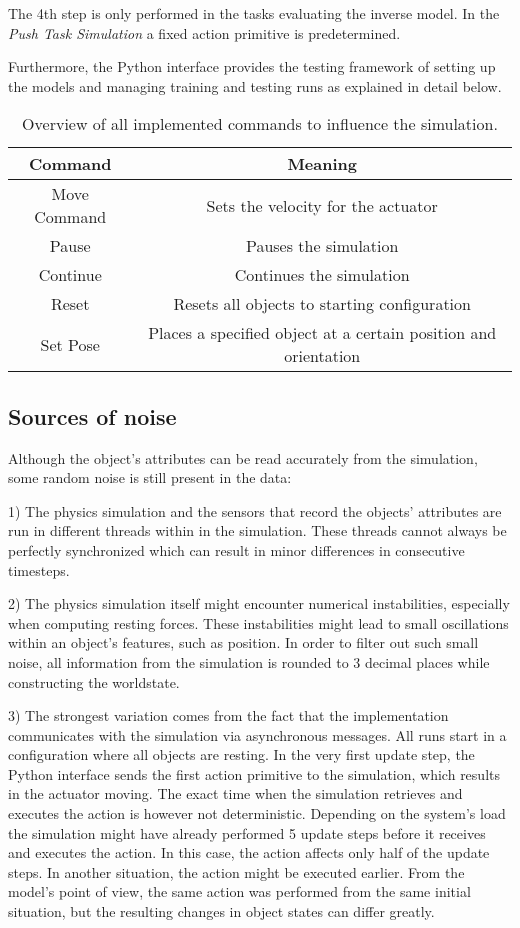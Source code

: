 The 4th step is only performed in the tasks evaluating the inverse model. In the \textit{Push Task Simulation} a fixed action primitive is predetermined.

Furthermore, the Python interface provides the testing framework of setting up the models and managing training and testing runs as explained in detail below.

\begin{table}
	\centering
	\begin{tabular}{|c|c|}
		\hline \textbf{Command} & \textbf{Meaning} \\ 
		\hline Move Command & Sets the velocity for the actuator \\ 
		\hline Pause & Pauses the simulation \\
		\hline Continue & Continues the simulation \\
		\hline Reset & Resets all objects to starting configuration \\
		\hline Set Pose & Places a specified object at a certain position and orientation \\
		\hline
	\end{tabular} 
	\caption{Overview of all implemented commands to influence the simulation.}
	\label{tab:commands}
\end{table}

\subsection{Sources of noise}

Although the object's attributes can be read accurately from the simulation, some random noise is still present in the data: 

1) The physics simulation and the sensors that record the objects' attributes are run in different threads within
in the simulation. These threads cannot always be perfectly synchronized which can result in minor differences in consecutive timesteps. 

2) The physics simulation itself might encounter numerical instabilities, especially when computing resting forces. These instabilities
might lead to small oscillations within an object's features, such as position. In order to filter out such small noise, all
information from the simulation is rounded to 3 decimal places while constructing the worldstate. 

3) The strongest variation comes from the fact that the implementation communicates with the simulation via asynchronous messages. 
All runs start in a configuration where all objects are resting. In the very first update step, the Python interface sends the first
action primitive to the simulation, which results in the actuator moving. The exact time when the simulation retrieves and executes
the action is however not deterministic. Depending on the system's load the simulation might have already performed 5 update steps before
it receives and executes the action. In this case, the action affects only half of the update steps. In another situation, the action might
be executed earlier. From the model's point of view, the same action was performed from the same initial situation, but the resulting changes in object states can differ greatly. 

